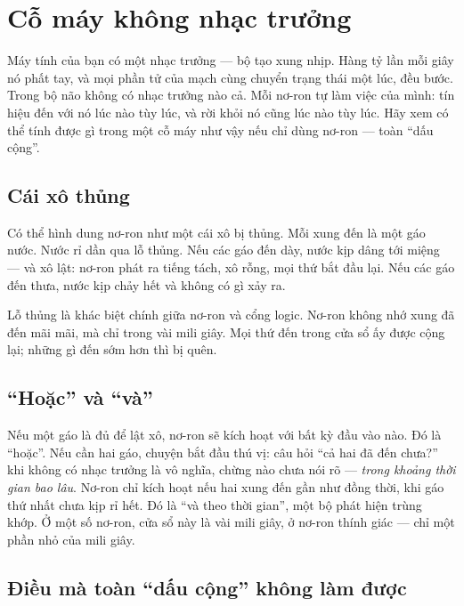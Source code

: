 \chapter{Cỗ máy không nhạc trưởng}

Máy tính của bạn có một nhạc trưởng --- bộ tạo xung nhịp. Hàng tỷ lần mỗi giây nó phất tay, và mọi phần tử của mạch cùng chuyển trạng thái một lúc, đều bước. Trong bộ não không có nhạc trưởng nào cả. Mỗi nơ-ron tự làm việc của mình: tín hiệu đến với nó lúc nào tùy lúc, và rời khỏi nó cũng lúc nào tùy lúc. Hãy xem có thể tính được gì trong một cỗ máy như vậy nếu chỉ dùng nơ-ron  --- toàn ``dấu cộng''.

\section*{Cái xô thủng}

Có thể hình dung nơ-ron như một cái xô bị thủng. Mỗi xung đến là một gáo nước. Nước rỉ dần qua lỗ thủng. Nếu các gáo đến dày, nước kịp dâng tới miệng --- và xô lật: nơ-ron phát ra tiếng tách, xô rỗng, mọi thứ bắt đầu lại. Nếu các gáo đến thưa, nước kịp chảy hết và không có gì xảy ra.


Lỗ thủng là khác biệt chính giữa nơ-ron và cổng logic. Nơ-ron không nhớ xung đã đến mãi mãi, mà chỉ trong vài mili giây. Mọi thứ đến trong cửa sổ ấy được cộng lại; những gì đến sớm hơn thì bị quên.

\section*{``Hoặc'' và ``và''}

Nếu một gáo là đủ để lật xô, nơ-ron sẽ kích hoạt với bất kỳ đầu vào nào. Đó là ``hoặc''. Nếu cần hai gáo, chuyện bắt đầu thú vị: câu hỏi ``cả hai đã đến chưa?'' khi không có nhạc trưởng là vô nghĩa, chừng nào chưa nói rõ --- \emph{trong khoảng thời gian bao lâu}. Nơ-ron chỉ kích hoạt nếu hai xung đến gần như đồng thời, khi gáo thứ nhất chưa kịp rỉ hết. Đó là ``và theo thời gian'', một bộ phát hiện trùng khớp. Ở một số nơ-ron, cửa sổ này là vài mili giây, ở nơ-ron thính giác --- chỉ một phần nhỏ của mili giây.

\section*{Điều mà toàn ``dấu cộng'' không làm được}


